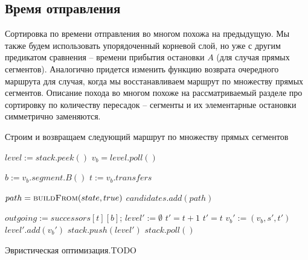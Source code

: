 \subsection{Время отправления}
Сортировка по времени отправления во многом похожа на предыдущую. Мы также будем использовать упорядоченный корневой слой, но уже с другим предикатом сравнения -- времени прибытия остановки $A$ (для случая прямых сегментов). Аналогично придется изменить функцию возврата очередного маршрута для случая, когда мы восстанавливаем маршрут по множеству прямых сегментов. Описание похода во многом похоже на рассматриваемый разделе про сортировку по количеству пересадок -- сегменты и их элементарные остановки симметрично заменяются.

\begin{algorithm}[!h]
	\caption{Строим и возвращаем следующий маршрут по множеству прямых сегментов}\label{lst5}
	\begin{algorithmic}
			\State $level := stack.peek()$ 
				\State $v_b = level.poll()$ 
				
				\State $b := v_b.segment.B()$
				\State $t := v_b.transfers$
				
				 
				\State $path = \Call{buildFrom}{state, true}$ 
				\State $candidates.add(path)$ 
				\EndIf
				
				\State $outgoing := successors[t][b]$;
				\State $level' := \emptyset$ 
				\State $t' = t + 1$
				\Else
				\State $t' = t$
				\EndIf
				\State $v_b' := (v_b, s', t')$
				\State $level'.add(v_b')$
				\EndFor
				\State $stack.push(level')$
				\EndIf
			\Else
				\State $stack.poll()$ 
			\EndIf
		\EndWhile
		\EndFunction
	\end{algorithmic}
\end{algorithm}

Эвристическая оптимизация.TODO

\FloatBarrier
